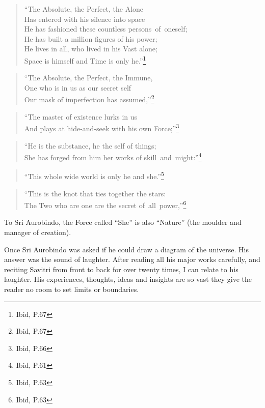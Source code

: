 \documentclass[12pt,a4paper]{book}
\begin{document}
\begin{verse}
``The Absolute, the Perfect, the Alone\\
Has entered with his silence into space\\
He has fashioned these countless \mbox{persons of~oneself};\\
He has built a million figures of his power;\\
He lives in all, who lived in his Vast alone;\\
Space is himself and Time is only he.''\footnote{Ibid, P.67}
\end{verse}

\begin{verse}
``The Absolute, the Perfect, the Immune,\\
One who is in us as our secret self\\
Our mask of imperfection has assumed,''\footnote{Ibid, P.67}
\end{verse}

\begin{verse}
``The master of existence lurks in us\\
And plays at hide-and-seek with his own Force;''\footnote{Ibid, P.66}
\end{verse}

\begin{verse}
``He is the substance, he the self of things;\\
She has forged from him her works of skill~and~might:''\footnote{Ibid, P.61}
\end{verse}

\begin{verse}
``This whole wide world is only he and she.''\footnote{Ibid, P.63}
\end{verse}

\begin{verse}
``This is the knot that ties together the stars:\\
The Two who are one are the secret of~all~power,''\footnote{Ibid, P.63}
\end{verse}

To Sri Aurobindo, the Force called ``She'' is also ``Nature'' (the
moulder and manager of creation).

Once Sri Aurobindo was asked if he could draw a diagram of the
universe. His answer was the sound of laughter. After reading all his
major works carefully, and reciting Savitri from front to back for
over twenty times, I can relate to his laughter. His experiences,
thoughts, ideas and insights are so vast they give the reader no room
to set limits or boundaries.
\end{document}
